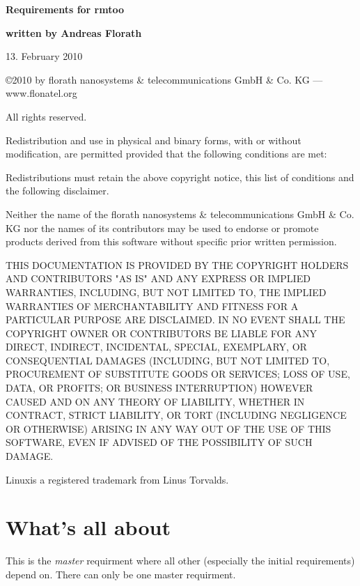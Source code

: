 \documentclass{article}
\begin{document}
\thispagestyle{empty}

\mbox{}

\vfill

{\LARGE\textbf{Requirements for rmtoo}}

\vfill

{\Large\textbf{written by Andreas Florath}}

\vfill

13. February 2010

\vfill

\newpage

\mbox{}

\vfill

{\small

\copyright 2010 by florath nanosystems \& telecommunications GmbH \& Co. KG
--- www.flonatel.org 

All rights reserved.

Redistribution and use in physical and binary forms, with or without
modification, are permitted provided that the following conditions are
met:

Redistributions must retain the above copyright notice, this list of
conditions and the following disclaimer.

Neither the name of the florath nanosystems \& telecommunications GmbH
\& Co. KG nor the names of its contributors may be used to endorse or
promote products derived from this software without specific prior
written permission.

THIS DOCUMENTATION IS PROVIDED BY THE COPYRIGHT HOLDERS AND
CONTRIBUTORS "AS IS" AND ANY EXPRESS OR IMPLIED WARRANTIES, INCLUDING,
BUT NOT LIMITED TO, THE IMPLIED WARRANTIES OF MERCHANTABILITY AND
FITNESS FOR A PARTICULAR PURPOSE ARE DISCLAIMED. IN NO EVENT SHALL THE
COPYRIGHT OWNER OR CONTRIBUTORS BE LIABLE FOR ANY DIRECT, INDIRECT,
INCIDENTAL, SPECIAL, EXEMPLARY, OR CONSEQUENTIAL DAMAGES (INCLUDING,
BUT NOT LIMITED TO, PROCUREMENT OF SUBSTITUTE GOODS OR SERVICES; LOSS
OF USE, DATA, OR PROFITS; OR BUSINESS INTERRUPTION) HOWEVER CAUSED AND
ON ANY THEORY OF LIABILITY, WHETHER IN CONTRACT, STRICT LIABILITY, OR
TORT (INCLUDING NEGLIGENCE OR OTHERWISE) ARISING IN ANY WAY OUT OF THE
USE OF THIS SOFTWARE, EVEN IF ADVISED OF THE POSSIBILITY OF SUCH
DAMAGE.

Linux\textregistered is a registered trademark from Linus Torvalds.
}
\newpage

\tableofcontents

\newpage

\section{What's all about}
This is the \textsl{master} requirment where all other (especially the
initial requirements) depend on. There can only be one master requirment.

\end{document}
